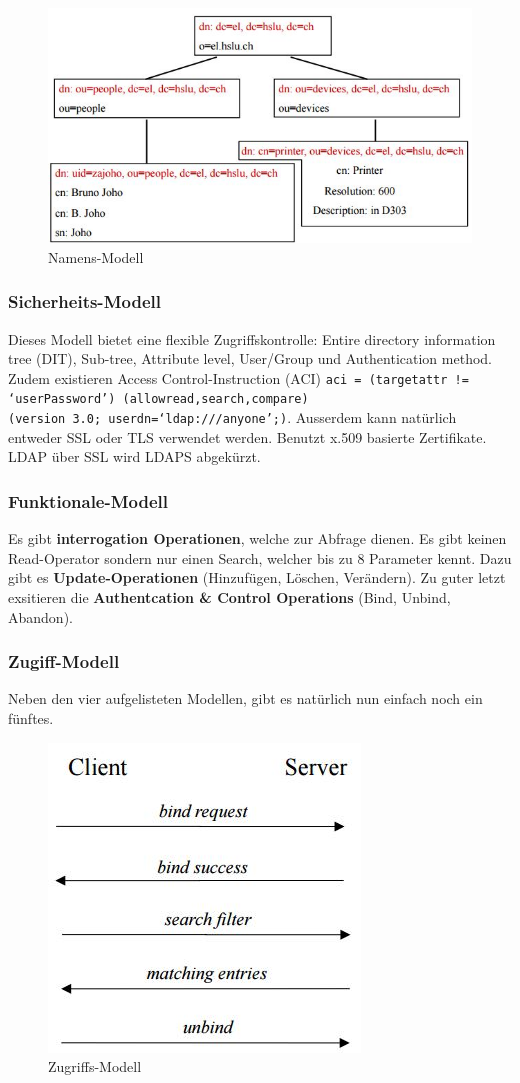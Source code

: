 \begin{figure}[h!]
\centering
\includegraphics[width=0.7\linewidth]{fig/ldap-namens-modell}
\caption{Namens-Modell}
\label{fig:ldap-namens-modell}
\end{figure}

\subsubsection{Sicherheits-Modell}
Dieses Modell bietet eine flexible Zugriffskontrolle: Entire directory information tree (DIT), Sub-tree, Attribute level, User/Group und Authentication method. Zudem existieren Access Control-Instruction (ACI) \verb|aci = (targetattr != ‘userPassword’) (allowread,search,compare)| \\ \verb|(version 3.0; userdn=‘ldap:///anyone’;)|. Ausserdem kann natürlich entweder SSL oder TLS verwendet werden. Benutzt x.509 basierte Zertifikate. LDAP über SSL wird LDAPS abgekürzt.

\subsubsection{Funktionale-Modell}
Es gibt \textbf{interrogation Operationen}, welche zur Abfrage dienen. Es gibt keinen Read-Operator sondern nur einen Search, welcher bis zu 8 Parameter kennt. Dazu gibt es \textbf{Update-Operationen} (Hinzufügen, Löschen, Verändern). Zu guter letzt exsitieren die \textbf{Authentcation \& Control Operations} (Bind, Unbind, Abandon).

\subsubsection{Zugiff-Modell}
Neben den vier aufgelisteten Modellen, gibt es natürlich nun einfach noch ein fünftes. 
\begin{figure}[h!]
\centering
\includegraphics[width=0.4\linewidth]{fig/ldap-zugriffs-modell}
\caption{Zugriffs-Modell}
\label{fig:ldap-zugriffs-modell}
\end{figure}